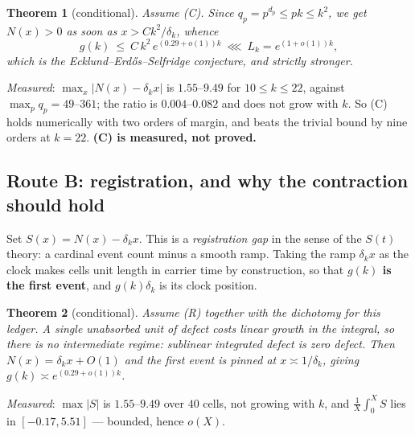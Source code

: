 \documentclass[11pt]{article}
\newtheorem{theorem}{Theorem}
\begin{document}
\begin{center}\end{center}

\begin{theorem}[conditional]\label{thm:routeA}
Assume \textup{(C)}.  Since $q_p=p^{d_p}\le pk\le k^{2}$, we get $N(x)>0$ as soon as
$x>Ck^{2}/\delta_k$, whence
\[
  g(k)\ \le\ C\,k^{2}\,e^{(0.29+o(1))k}\ \lll\ L_k=e^{(1+o(1))k},
\]
which is the Ecklund--Erd\H{o}s--Selfridge conjecture, and strictly stronger.
\end{theorem}

\emph{Measured}: $\max_x|N(x)-\delta_kx|$ is $1.55$--$9.49$ for $10\le k\le22$, against
$\max_pq_p=49$--$361$; the ratio is $0.004$--$0.082$ and does not grow with $k$.  So (C)
holds numerically with two orders of margin, and beats the trivial bound by nine orders at
$k=22$.  \textbf{(C) is measured, not proved.}

\subsection{Route B: registration, and why the contraction should hold}
Set $S(x)=N(x)-\delta_kx$.  This is a \emph{registration gap} in the sense of the
$S(t)$ theory: a cardinal event count minus a smooth ramp.  Taking the ramp $\delta_kx$ as
the clock makes cells unit length in carrier time by construction, so that
\textbf{$g(k)$ is the first event}, and $g(k)\delta_k$ is its clock position.

\begin{center}\end{center}

\begin{theorem}[conditional]\label{thm:routeB}
Assume \textup{(R)} together with the dichotomy for this ledger.  A single unabsorbed unit of
defect costs linear growth in the integral, so there is no intermediate regime: sublinear
integrated defect is zero defect.  Then $N(x)=\delta_kx+O(1)$ and the first event is pinned
at $x\asymp1/\delta_k$, giving $g(k)\asymp e^{(0.29+o(1))k}$.
\end{theorem}

\emph{Measured}: $\max|S|$ is $1.55$--$9.49$ over $40$ cells, not growing with $k$, and
$\frac1X\int_0^XS$ lies in $[-0.17,5.51]$ --- bounded, hence $o(X)$.
\end{document}
